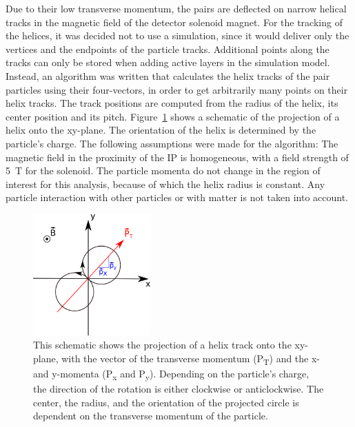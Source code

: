 Due to their low transverse momentum, the pairs are deflected on narrow helical tracks in the magnetic field of the detector solenoid magnet.
For the tracking of the helices, it was decided not to use a \geant simulation, since it would deliver only the vertices and the endpoints of the particle tracks.
Additional points along the tracks can only be stored when adding active layers in the simulation model.
Instead, an algorithm was written that calculates the helix tracks of the pair particles using their four-vectors, in order to get arbitrarily many points on their helix tracks. 
The track positions are computed from the radius of the helix, its center position and its pitch.
Figure~\ref{fig:helix_circle} shows a schematic of the projection of a helix onto the xy-plane.
The orientation of the helix is determined by the particle's charge.
The following assumptions were made for the algorithm:
The magnetic field in the proximity of the IP is homogeneous, with a field strength of \SI{5}{\tesla} for the \sid solenoid.
The particle momenta do not change in the region of interest for this analysis, because of which the helix radius is constant.
Any particle interaction with other particles or with matter is not taken into account.
\begin{figure}
    \centering
    \includegraphics[width=0.4\textwidth]{Figures/Pairs/Helix_explanation.png}
    \caption[Schematic projection of a helix track on the xy-plane]{
    This schematic shows the projection of a helix track onto the xy-plane, with the vector of the transverse momentum (P\textsubscript{T}) and the x- and y-momenta (P\textsubscript{x} and P\textsubscript{y}).
    Depending on the particle's charge, the direction of the rotation is either clockwise or anticlockwise.
    The center, the radius, and the orientation of the projected circle is dependent on the transverse momentum of the particle.
    }
    \label{fig:helix_circle}
\end{figure}
